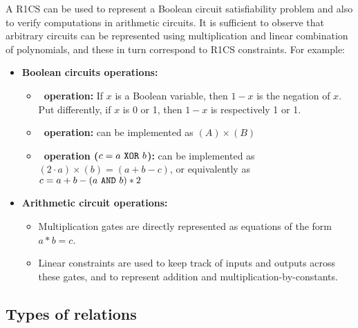 	A R1CS can be used to represent a Boolean circuit satisfiability 
problem and also to verify computations in arithmetic circuits.
	It is sufficient to observe that arbitrary circuits can be represented 
using multiplication and linear combination of polynomials, and these 
in turn correspond to R1CS constraints. For example:

\begin{itemize}

\item \textbf{Boolean circuits operations:}

	\begin{itemize}

	\item \textbf{\NOT\ operation:}
	If $x$ is a Boolean variable, then $1-x$ is the negation of $x$.
	Put differently, if $x$ is 0 or 1, then $1-x$ is respectively 1 or 1.

	\item \textbf{\AND\ operation:} 
		can be implemented as $(A) \times (B)$

	\item \textbf{\XOR\ operation ($c = a~\texttt{XOR}~b$):}
		can be implemented as $(2 \cdot a ) \times (b) = (a + b - c)$, 
	or equivalently as $c = a + b - (a~\texttt{AND}~b) \ast 2$
	\end{itemize}


\item \textbf{Arithmetic circuit operations:} 

	\begin{itemize}
	\item Multiplication gates are directly represented as equations of the form $a \ast b = c$.
	\item Linear constraints are used to keep track of inputs and outputs across these gates, 
and to represent addition and multiplication-by-constants.
	\end{itemize}

\end{itemize}


\subsection{Types of relations}
\label{security:spec-statements-ZK:types-of-relations}

 
